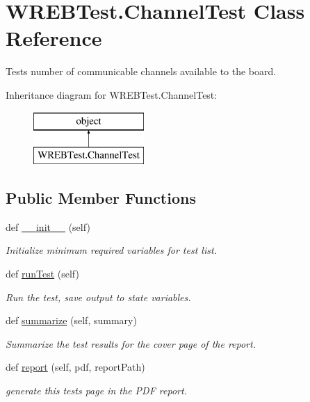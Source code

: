 \hypertarget{class_w_r_e_b_test_1_1_channel_test}{}\section{W\+R\+E\+B\+Test.\+Channel\+Test Class Reference}
\label{class_w_r_e_b_test_1_1_channel_test}


Tests number of communicable channels available to the board.  


Inheritance diagram for W\+R\+E\+B\+Test.\+Channel\+Test\+:\begin{figure}[H]
\begin{center}
\leavevmode
\includegraphics[height=2.000000cm]{class_w_r_e_b_test_1_1_channel_test}
\end{center}
\end{figure}
\subsection*{Public Member Functions}
\begin{DoxyCompactItemize}
\item 
def \hyperlink{class_w_r_e_b_test_1_1_channel_test_a52771dc0fe0c01373ebd9857bdaa45b1}{\+\_\+\+\_\+init\+\_\+\+\_\+} (self)
\begin{DoxyCompactList}\small\item\em Initialize minimum required variables for test list. \end{DoxyCompactList}\item 
def \hyperlink{class_w_r_e_b_test_1_1_channel_test_aad063c6ec4ec9b834f3799e1aa5d2d32}{run\+Test} (self)
\begin{DoxyCompactList}\small\item\em Run the test, save output to state variables. \end{DoxyCompactList}\item 
def \hyperlink{class_w_r_e_b_test_1_1_channel_test_a298393ff7375dbd2928d83b3fa1448c6}{summarize} (self, summary)
\begin{DoxyCompactList}\small\item\em Summarize the test results for the cover page of the report. \end{DoxyCompactList}\item 
def \hyperlink{class_w_r_e_b_test_1_1_channel_test_a0d929d9ab91f224afa432d3e461a3575}{report} (self, pdf, report\+Path)
\begin{DoxyCompactList}\small\item\em generate this test\textquotesingle{}s page in the P\+DF report. \end{DoxyCompactList}\end{DoxyCompactItemize}


